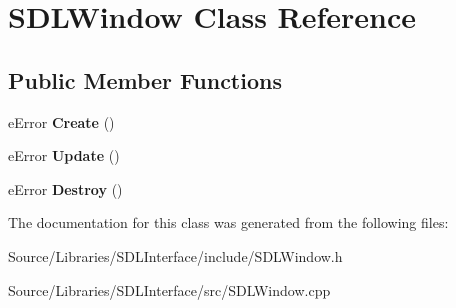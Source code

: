 \hypertarget{class_s_d_l_window}{\section{S\-D\-L\-Window Class Reference}
\label{class_s_d_l_window}
}
\subsection*{Public Member Functions}
\begin{DoxyCompactItemize}
\item 
\hypertarget{class_s_d_l_window_a745cd15bec2ad99813fb082f67896488}{e\-Error {\bfseries Create} ()}\label{class_s_d_l_window_a745cd15bec2ad99813fb082f67896488}

\item 
\hypertarget{class_s_d_l_window_a48f1ae5f9326fa006e8df73d4d0bd85f}{e\-Error {\bfseries Update} ()}\label{class_s_d_l_window_a48f1ae5f9326fa006e8df73d4d0bd85f}

\item 
\hypertarget{class_s_d_l_window_ab693926c16954fb9b6ec5cb0711ac117}{e\-Error {\bfseries Destroy} ()}\label{class_s_d_l_window_ab693926c16954fb9b6ec5cb0711ac117}

\end{DoxyCompactItemize}


The documentation for this class was generated from the following files\-:\begin{DoxyCompactItemize}
\item 
Source/\-Libraries/\-S\-D\-L\-Interface/include/S\-D\-L\-Window.\-h\item 
Source/\-Libraries/\-S\-D\-L\-Interface/src/S\-D\-L\-Window.\-cpp\end{DoxyCompactItemize}
